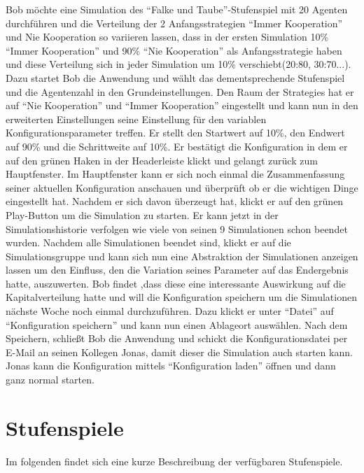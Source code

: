 \documentclass[parskip=full,11pt]{scrartcl}
\begin{document}
Bob möchte eine Simulation des \enquote{Falke und Taube}-Stufenspiel mit 20 Agenten durchführen und die Verteilung der 2 Anfangsstrategien \enquote{Immer Kooperation} und Nie Kooperation so variieren lassen, dass in der ersten Simulation 10\% \enquote{Immer Kooperation} und 90\% \enquote{Nie Kooperation} als Anfangsstrategie haben und diese Verteilung sich in jeder Simulation um 10\% verschiebt(20:80, 30:70...). Dazu startet Bob die Anwendung und wählt das dementsprechende Stufenspiel und die Agentenzahl in den Grundeinstellungen. Den Raum der \Glspl{Strategie} hat er auf \enquote{Nie Kooperation} und \enquote{Immer Kooperation} eingestellt und kann nun in den erweiterten Einstellungen seine Einstellung für den variablen Konfigurationsparameter treffen. Er stellt den Startwert auf 10\%, den Endwert auf 90\% und die Schrittweite auf 10\%. Er bestätigt die Konfiguration in dem er auf den grünen Haken in der Headerleiste klickt und gelangt zurück zum Hauptfenster. Im Hauptfenster kann er sich noch einmal die Zusammenfassung seiner aktuellen Konfiguration anschauen und überprüft ob er die wichtigen Dinge eingestellt hat. Nachdem er sich davon überzeugt hat, klickt er auf den grünen Play-Button um die Simulation zu starten. Er kann jetzt in der Simulationshistorie verfolgen wie viele von seinen 9 Simulationen schon beendet wurden. Nachdem alle Simulationen beendet sind, klickt er auf die Simulationsgruppe und kann sich nun eine Abstraktion der Simulationen anzeigen lassen um den Einfluss, den die Variation seines Parameter auf das Endergebnis hatte, auszuwerten. Bob findet ,dass diese eine interessante Auswirkung auf die Kapitalverteilung hatte und will die Konfiguration speichern um die Simulationen nächste Woche noch einmal durchzuführen. Dazu klickt er unter \enquote{Datei} auf \enquote{Konfiguration speichern} und kann nun einen Ablageort auswählen. Nach dem Speichern, schließt Bob die Anwendung und schickt die Konfigurationsdatei per E-Mail an seinen Kollegen Jonas, damit dieser die Simulation auch starten kann. Jonas kann die Konfiguration mittels \enquote{Konfiguration laden} öffnen und dann ganz normal starten.

\newpage

\section{Stufenspiele}
Im folgenden findet sich eine kurze Beschreibung der verfügbaren Stufenspiele.
\end{document}
